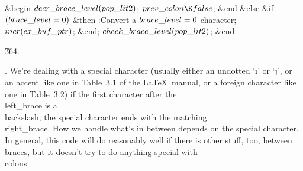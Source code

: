 \6
\&{begin} $\\{decr\_brace\_level}(\\{pop\_lit2})$;\5
$\\{prev\_colon}\K\\{false}$;\6
\&{end}\6
\4\&{else} \&{if} $(\\{brace\_level}=0)$ \1\&{then}\5
:Convert a $\\{brace\_level}=0$ character\X;\2\2\2\6
$\\{incr}(\\{ex\_buf\_ptr})$;\6
\&{end};\2\6
$\\{check\_brace\_level}(\\{pop\_lit2})$;\6
\&{end}\par
\U364.\fi

.
We're dealing with a special character (usually either an undotted
`\i' or `\j', or an accent like one in Table~3.1 of the \LaTeX\
manual, or a foreign character like one in Table~3.2) if the first
character after the \\{left\_brace} is a \\{backslash}; the special
character ends with the matching \\{right\_brace}.  How we handle what's
in between depends on the special character.  In general, this code
will do reasonably well if there is other stuff, too, between braces,
but it doesn't try to do anything special with \\{colon}s.

